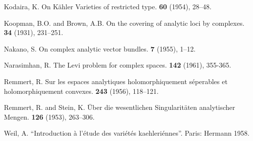\documentclass{article}
\theoremstyle{plain}
\theoremstyle{definition}
\begin{document}
\begin{thebibliography}{20}
  {\sc Kodaira, K.}
  \newblock On K\"{a}hler Varieties of restricted type.
   {\bf 60} (1954), 28--48.

  {\sc Koopman, B.O. and Brown, A.B.}
  \newblock On the covering of analytic loci by complexes.
   {\bf 34} (1931), 231--251.

  {\sc Nakano, S.}
  \newblock On complex analytic vector bundles.
   {\bf 7} (1955), 1--12.

  {\sc Narasimhan, R.}
  \newblock The Levi problem for complex spaces.
   {\bf 142} (1961), 355-365.

  {\sc Remmert, R.}
  \newblock Sur les espaces analytiques holomorphiquement s\'{e}perables et holomorphiquement convexes.
   {\bf 243} (1956), 118--121.

  {\sc Remmert, R. and Stein, K.}
  \newblock \"{U}ber die wesentlichen Singularit\"{a}ten analytischer Mengen.
   {\bf 126} (1953), 263--306.

  {\sc Weil, A.}
  \newblock ``Introduction \`{a} l'\'{e}tude des vari\'{e}t\'{e}s kaehleri\'{e}nnes''.
  \newblock Paris: Hermann 1958.

\end{thebibliography}
\end{document}
